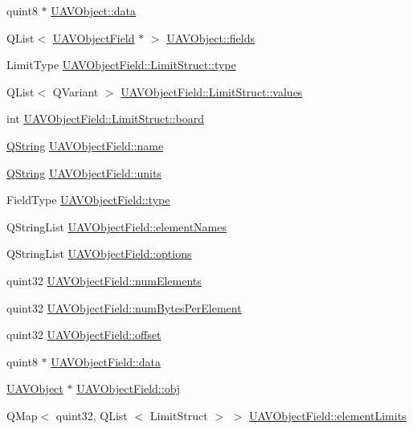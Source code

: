 \begin{DoxyCompactItemize}
\item 
quint8 $\ast$ \hyperlink{group___u_a_v_objects_plugin_gadb2f4800bd3b6fb89c0f7c9fb67e49ff}{\-U\-A\-V\-Object\-::data}
\item 
\-Q\-List$<$ \hyperlink{class_u_a_v_object_field}{\-U\-A\-V\-Object\-Field} $\ast$ $>$ \hyperlink{group___u_a_v_objects_plugin_gaafc65699167bc5cedfd058400e484df6}{\-U\-A\-V\-Object\-::fields}
\item 
\-Limit\-Type \hyperlink{group___u_a_v_objects_plugin_ga7f346cc2754bc63a0a0ae587b183b3ff}{\-U\-A\-V\-Object\-Field\-::\-Limit\-Struct\-::type}
\item 
\-Q\-List$<$ \-Q\-Variant $>$ \hyperlink{group___u_a_v_objects_plugin_ga27188ffa94eb6c560765dd56b0471561}{\-U\-A\-V\-Object\-Field\-::\-Limit\-Struct\-::values}
\item 
int \hyperlink{group___u_a_v_objects_plugin_gae5d5e0653c652c0e50c62526f8fbee72}{\-U\-A\-V\-Object\-Field\-::\-Limit\-Struct\-::board}
\item 
\hyperlink{group___u_a_v_objects_plugin_gab9d252f49c333c94a72f97ce3105a32d}{\-Q\-String} \hyperlink{group___u_a_v_objects_plugin_ga9909de3b60e1a954d7356cfc61357b30}{\-U\-A\-V\-Object\-Field\-::name}
\item 
\hyperlink{group___u_a_v_objects_plugin_gab9d252f49c333c94a72f97ce3105a32d}{\-Q\-String} \hyperlink{group___u_a_v_objects_plugin_ga1ecf5fdaab2ac408b67623d5d75368c5}{\-U\-A\-V\-Object\-Field\-::units}
\item 
\-Field\-Type \hyperlink{group___u_a_v_objects_plugin_gad84e6c3a333d2c62b5159936e42fb737}{\-U\-A\-V\-Object\-Field\-::type}
\item 
\-Q\-String\-List \hyperlink{group___u_a_v_objects_plugin_ga5849334da3325c4cac8625bb5910d57d}{\-U\-A\-V\-Object\-Field\-::element\-Names}
\item 
\-Q\-String\-List \hyperlink{group___u_a_v_objects_plugin_ga97fe1c3ed2d74eb06ea7e24abf4ce09c}{\-U\-A\-V\-Object\-Field\-::options}
\item 
quint32 \hyperlink{group___u_a_v_objects_plugin_gaa82f6e1f5deca501c58b45d902be0ef4}{\-U\-A\-V\-Object\-Field\-::num\-Elements}
\item 
quint32 \hyperlink{group___u_a_v_objects_plugin_gaed675e1711f18b1ab737f9e8e55dca35}{\-U\-A\-V\-Object\-Field\-::num\-Bytes\-Per\-Element}
\item 
quint32 \hyperlink{group___u_a_v_objects_plugin_ga8d473734be71fe3a3dbcd1a854b497f2}{\-U\-A\-V\-Object\-Field\-::offset}
\item 
quint8 $\ast$ \hyperlink{group___u_a_v_objects_plugin_gae6a068d71cfd70f70c7e6fb10f217ca5}{\-U\-A\-V\-Object\-Field\-::data}
\item 
\hyperlink{class_u_a_v_object}{\-U\-A\-V\-Object} $\ast$ \hyperlink{group___u_a_v_objects_plugin_ga750b9ade4270026bd2d02d37468597b5}{\-U\-A\-V\-Object\-Field\-::obj}
\item 
\-Q\-Map$<$ quint32, \-Q\-List\*
$<$ \-Limit\-Struct $>$ $>$ \hyperlink{group___u_a_v_objects_plugin_ga16abb7c1b891411815fe34473448b9ce}{\-U\-A\-V\-Object\-Field\-::element\-Limits}
\end{DoxyCompactItemize}
